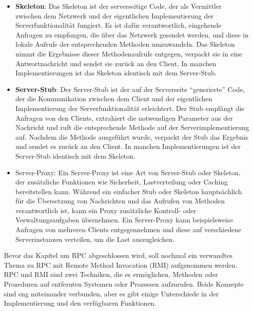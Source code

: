 \documentclass[../vs-script-first-v01.tex]{subfiles}
\begin{document}
\begin{itemize} 
\item \textbf{Skeleton}: Das Skeleton ist der serverseitige Code, der als Vermittler zwischen dem Netzwerk und der eigentlichen Implementierung der Serverfunktionalität fungiert. Es ist dafür verantwortlich, eingehende Anfragen zu empfangen, die über das Netzwerk gesendet werden, und diese in lokale Aufrufe der entsprechenden Methoden umzuwandeln. Das Skeleton nimmt die Ergebnisse dieser Methodenaufrufe entgegen, verpackt sie in eine Antwortnachricht und sendet sie zurück an den Client. In manchen Implementierungen ist das Skeleton identisch mit dem Server-Stub.
\item \textbf{Server-Stub}: Der Server-Stub ist der auf der Serverseite \enquote{generierte} Code, der die Kommunikation zwischen dem Client und der eigentlichen Implementierung der Serverfunktionalität erleichtert. Der Stub empfängt die Anfragen von den Clients, extrahiert die notwendigen Parameter aus der Nachricht und ruft die entsprechende Methode auf der Serverimplementierung auf. Nachdem die Methode ausgeführt wurde, verpackt der Stub das Ergebnis und sendet es zurück an den Client. In manchen Implementierungen ist der Server-Stub identisch mit dem Skeleton.
\item Server-Proxy: Ein Server-Proxy ist eine Art von Server-Stub oder Skeleton, der zusätzliche Funktionen wie Sicherheit, Lastverteilung oder Caching bereitstellen kann. Während ein einfacher Stub oder Skeleton hauptsächlich für die Übersetzung von Nachrichten und das Aufrufen von Methoden verantwortlich ist, kann ein Proxy zusätzliche Kontroll- oder Verwaltungsaufgaben übernehmen. Ein Server-Proxy kann beispielsweise Anfragen von mehreren Clients entgegennehmen und diese auf verschiedene Serverinstanzen verteilen, um die Last auszugleichen.
\end{itemize} 

Bevor das Kapitel um RPC abgeschlossen wird, soll nochmal ein verwandtes Thema zu RPC mit Remote Method Invocation (RMI)  aufgenommen werden. RPC und RMI sind zwei Techniken, die es ermöglichen, Methoden oder Prozeduren auf entfernten Systemen oder Prozessen aufzurufen. Beide Konzepte sind eng miteinander verbunden, aber es gibt einige Unterschiede in der Implementierung und den verfügbaren Funktionen.
\end{document}
